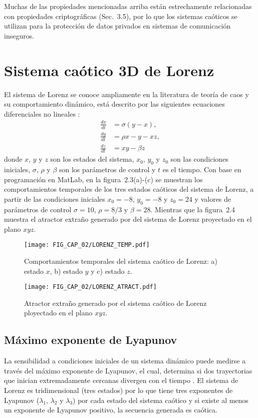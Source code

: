 Muchas de las propiedades mencionadas arriba están estrechamente relacionadas con propiedades criptográficas (Sec.~3.5), por lo que los sistemas caóticos se utilizan para la protección de datos privados en sistemas de comunicación inseguros. \\

\section{Sistema caótico 3D de Lorenz}
El sistema de Lorenz se conoce ampliamente en la literatura de teoría de caos y su comportamiento dinámico, está descrito por las siguientes ecuaciones diferenciales no lineales \cite{L_1963}:
\begin{subequations}
\begin{align}
\frac{dx}{dt}&=\sigma(y-x), \\
\frac{dy}{dt}&=\rho x-y-xz, \\
\frac{dz}{dt}&=xy-\beta z
\end{align}
\end{subequations}
donde $x$, $y$ y $z$ son los estados del sistema, $x_{0}$, $y_{0}$ y $z_{0}$ son las condiciones iniciales, $\sigma$, $\rho$ y $\beta$ son los parámetros de control y $t$ es el tiempo. Con base en programación en MatLab, en la figura~2.3(a)-(c) se muestran los comportamientos temporales de los tres estados caóticos del sistema de Lorenz, a partir de las condiciones iniciales $x_{0}=-8$, $y_{0}=-8$ y $z_{0}=24$ y valores de parámetros de control $\sigma=10$, $\rho=8/3$ y $\beta=28$. Mientras que la figura~2.4 muestra el atractor extraño generado por del sistema de Lorenz proyectado en el plano $xyz$.

\begin{figure}[!htbp] %
	\center
	\texttt{[image: FIG\_CAP\_02/LORENZ\_TEMP.pdf]}  
	\caption{Comportamientos temporales del sistema caótico de Lorenz: a) estado $x$, b) estado $y$ y c) estado $z$.}
\end{figure}

\begin{figure}[!htbp] %
	\center
	\texttt{[image: FIG\_CAP\_02/LORENZ\_ATRACT.pdf]}  
	\caption{Atractor extraño generado por el sistema caótico de Lorenz ployectado en el plano $xyz$.}
\end{figure}

\subsection{Máximo exponente de Lyapunov}
La sensibilidad a condiciones iniciales de un sistema dinámico puede medirse a través del máximo exponente de Lyapunov, el cual, determina si dos trayectorias que inician extremadamente cercanas divergen con el tiempo \cite{W_1986}. El sistema de Lorenz es tridimensional (tres estados) por lo que tiene tres exponentes de Lyapunov ($\lambda_{1}$, $\lambda_{2}$ y $\lambda_{3}$) por cada estado del sistema caótico y si existe al menos un exponente de Lyapunov positivo, la secuencia generada es caótica. \\

